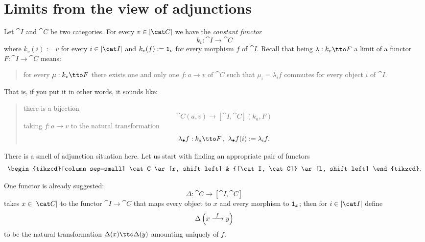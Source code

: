 
\section{Limits from the view of adjunctions}

Let \(\cat I\) and \(\cat C\) be two categories. For every \(v \in \obj{\cat C}\) we have the {\em constant functor}
\[k_v : \cat I \to \cat C\]
where \(k_v(i) := v\) for every \(i \in \obj{\cat I}\) and \(k_v(f) := \mathtt 1_v\) for every morphism \(f\) of \(\cat I\). Recall that being \(\lambda : k_v \tto F\) a limit of a functor \(F : \cat I \to \cat C\) means:
\begin{quotation}
for every \(\mu : k_v \tto F\) there exists one and only one \(f : a \to v\) of \(\cat C\) such that \(\mu_i = \lambda_i f\)
commutes for every object \(i\) of \(\cat I\).
\end{quotation}
That is, if you put it in other words, it sounds like:
\begin{quotation}
there is a bijection
\[\cat C(a, v) \to [\cat I, \cat C](k_a, F)\]
taking \(f : a \to v\) to the natural transformation
\[\lambda_\bullet f : k_a \tto F\,, \ \lambda_\bullet f (i):= \lambda_i f .\]
\end{quotation}

There is a smell of adjunction situation here. Let us start with finding an appropriate pair of functors
\[\begin{tikzcd}[column sep=small] \cat C \ar[r, shift left] & {[\cat I, \cat C]} \ar[l, shift left] \end{tikzcd} .\]

One functor is already suggested:
\[\Delta : \cat C \to [\cat I, \cat C]\]
takes \(x \in \obj{\cat C}\) to the functor \(\cat I \to \cat C\) that maps every object to \(x\) and every morphism to \(\mathtt 1_x\); then for \(i \in \obj{\cat I}\) define
\[\Delta \left(x \xrightarrow{\ f\ } y\right)\]
to be the natural transformation \(\Delta(x) \tto \Delta(y)\) amounting uniquely of \(f\).

